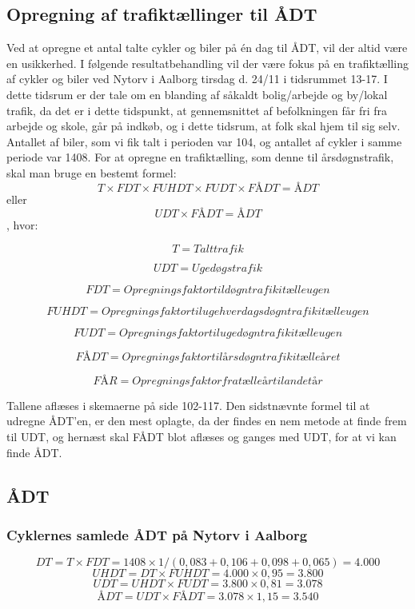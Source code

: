 \subsection{Opregning af trafiktællinger til ÅDT}
\label{sub:opregning}
Ved at opregne et antal talte cykler og biler på én dag til ÅDT, vil der altid være en usikkerhed. 
I følgende resultatbehandling vil der være fokus på en trafiktælling af cykler og biler ved Nytorv i Aalborg tirsdag d. 24/11 i tidsrummet 13-17. I dette tidsrum er der tale om en blanding af såkaldt bolig/arbejde og by/lokal trafik, da det er i dette tidspunkt, at gennemsnittet af befolkningen får fri fra arbejde og skole, går på indkøb, og i dette tidsrum, at folk skal hjem til sig selv.
Antallet af biler, som vi fik talt i perioden var 104, og antallet af cykler i samme periode var 1408.
For at opregne en trafiktælling, som denne til årsdøgnstrafik, skal man bruge en bestemt formel:
$$ T \times FDT \times FUHDT \times FUDT \times FÅDT = ÅDT $$ eller $$ UDT \times FÅDT = ÅDT$$ , hvor:

$$T = Talt trafik$$

$$UDT = Ugedøgstrafik$$

$$FDT = Opregningsfaktor til døgntrafik i tælleugen$$

$$FUHDT = Opregningsfaktor til ugehverdagsdøgntrafik i tælleugen$$

$$FUDT = Opregningsfaktor til ugedøgntrafik i tælleugen$$

$$FÅDT = Opregningsfaktor til årsdøgntrafik i tælleåret$$ 

$$FÅR = Opregningsfaktor fra tælleår til andet år$$

Tallene aflæses i skemaerne på side 102-117. Den sidstnævnte formel til at udregne ÅDT’en, er den mest oplagte, da der findes en nem metode at finde frem til UDT, og hernæst skal FÅDT blot aflæses og ganges med UDT, for at vi kan finde ÅDT.

\subsection{ÅDT}
\label{AEDT}
\subsubsection{Cyklernes samlede ÅDT på Nytorv i Aalborg}
$$DT = T \times FDT = 1408 \times 1/(0,083+0,106+0,098+0,065) = 4.000$$
$$UHDT = DT \times FUHDT = 4.000 \times 0,95 = 3.800$$
$$UDT = UHDT \times FUDT = 3.800 \times 0,81 = 3.078$$
$$ÅDT = UDT \times FÅDT = 3.078 \times 1,15 = 3.540$$
